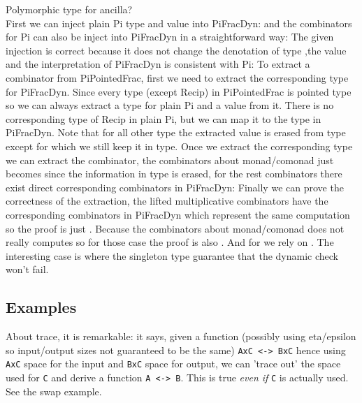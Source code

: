 \documentclass[sigplan,10pt,review,anonymous]{acmart}
\begin{document}
Polymorphic type for ancilla?
\\
First we can inject plain Pi type and value into PiFracDyn:
\INJU{}
and the combinators for Pi can also be inject into PiFracDyn in a straightforward way:
\INJcomb{}
The given injection is correct because it does not change the denotation of type
\INJUeq{}
,the value
\INJVeq{}
and the interpretation of PiFracDyn is consistent with Pi:
\INJEvaleq{}
To extract a combinator from PiPointedFrac, first we need to extract the corresponding type for PiFracDyn.
Since every type (except Recip) in PiPointedFrac is pointed type so we can always extract a type for plain
Pi and a value from it.
There is no corresponding type of Recip in plain Pi, but we can map it to the
\AgdaSpace{} type in PiFracDyn.
Note that for all other type the extracted value is erased from type except for
\AgdaSpace{}
which we still keep it in type.
\EXTU{}
Once we extract the corresponding type we can extract the combinator, the combinators about monad/comonad
just becomes  since the information in type is erased,
for the rest combinators there exist direct corresponding combinators in PiFracDyn:
\EXTUComb{}
Finally we can prove the correctness of the extraction,
the lifted multiplicative combinators have the corresponding combinators in PiFracDyn which represent
the same computation so the proof is just .
Because the combinators about monad/comonad does not really
computes so for those case the proof is also .
And for  we rely on .
The interesting case is  where the singleton type guarantee that
the dynamic check won't fail.
\EXTeq{}

\subsection{Examples}
\label{sec:cat}  

About trace, it is remarkable: it says, given a function (possibly
using eta/epsilon so input/output sizes not guaranteed to be the same)
\verb|AxC <-> BxC| hence using \verb|AxC| space for the input and
\verb|BxC| space for output, we can 'trace out' the space used for
\verb|C| and derive a function \verb|A <-> B|. This is true \emph{even
  if} \verb|C| is actually used. See the swap example.
\end{document}
